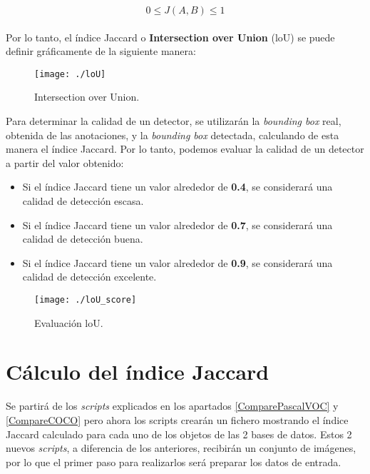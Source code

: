 \documentclass[a4paper, 12pt, spanish, chapterprefix, numbers=noenddot]{book}
\begin{document}
\begin{equation}
0\leq J(A,B) \leq  1
\end{equation}
\\
Por lo tanto, el índice Jaccard o \textbf{Intersection over Union} (loU) se puede definir gráficamente de la siguiente manera:

\begin{figure}[H]
\begin{center}
\texttt{[image: ./loU]}
\caption{Intersection over Union.}
\label{IntersectionOverUnion}
\end{center}
\end{figure}

Para determinar la calidad de un detector, se utilizarán la \textit{bounding box} real, obtenida de las anotaciones, y la \textit{bounding box} detectada, calculando de esta manera el índice Jaccard. Por lo tanto, podemos evaluar la calidad de un detector a partir del valor obtenido:

\begin{itemize}
\item Si el índice Jaccard tiene un valor alrededor de \textbf{0.4}, se considerará una calidad de detección escasa.
\item Si el índice Jaccard tiene un valor alrededor de \textbf{0.7}, se considerará una calidad de detección buena.
\item Si el índice Jaccard tiene un valor alrededor de \textbf{0.9}, se considerará una calidad de detección excelente.
\end{itemize}

\begin{figure}[H]
\begin{center}
\texttt{[image: ./loU\_score]}
\caption{Evaluación loU.}
\end{center}
\end{figure}


\section{Cálculo del índice Jaccard}

Se partirá de los \textit{scripts} explicados en los apartados \ref{ComparePascalVOC} y \ref{CompareCOCO} pero ahora los scripts crearán un fichero mostrando el índice Jaccard calculado para cada uno de los objetos de las 2 bases de datos. Estos 2 nuevos \textit{scripts}, a diferencia de los anteriores, recibirán un conjunto de imágenes, por lo que el primer paso para realizarlos será preparar los datos de entrada.\\
\end{document}
